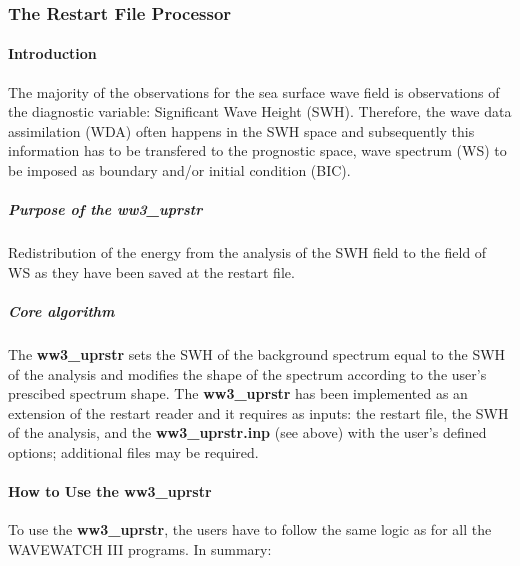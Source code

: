 \vsssub
\subsubsection{The Restart File Processor} \label{sec:ww3uprstr}
\vsssub



\vspace{\baselineskip} 

\paragraph{Introduction \newline } 

The majority of the observations for the sea surface wave field is 
observations of the diagnostic variable: Significant Wave Height (SWH). 
Therefore, the wave data assimilation (WDA) often happens in the SWH 
space and subsequently this  information has to be transfered to the 
prognostic space, wave spectrum (WS) to be imposed as boundary and/or 
initial condition (BIC). 

\subparagraph{Purpose of the \textbf{ww3\_uprstr} } Redistribution of 
the energy from the analysis of the SWH field to the field of WS as 
they have been saved at the restart file.

\subparagraph{Core algorithm \newline } 
The \textbf{ww3\_uprstr} sets the SWH of the background spectrum equal to 
the SWH of the analysis and modifies the shape of the spectrum according 
to the user's prescibed spectrum shape. The \textbf{ww3\_uprstr} has been  
implemented as an extension of the restart reader and it requires as inputs: 
the restart file, the SWH of the analysis, and the \textbf{ww3\_uprstr.inp} 
(see above) with the user's defined options; additional files may be
required.

\paragraph{How to Use the ww3\_uprstr \newline}
To use the \textbf{ww3\_uprstr}, the users have to follow the same logic 
as for all the WAVEWATCH III programs. In summary: 

